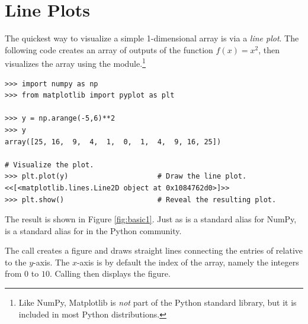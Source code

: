 \label{lab:Matplotlib}

\section*{Line Plots} %

The quickest way to visualize a simple 1-dimensional array is via a \emph{line plot}.
The following code creates an array of outputs of the function $f(x) = x^2$, then visualizes the array using the  module.\footnote{Like NumPy, Matplotlib is \emph{not} part of the Python standard library, but it is included in most Python distributions.}

\begin{lstlisting}
>>> import numpy as np
>>> from matplotlib import pyplot as plt

>>> y = np.arange(-5,6)**2
>>> y
array([25, 16,  9,  4,  1,  0,  1,  4,  9, 16, 25])

# Visualize the plot.
>>> plt.plot(y)                     # Draw the line plot.
<<[<matplotlib.lines.Line2D object at 0x1084762d0>]>>
>>> plt.show()                      # Reveal the resulting plot.
\end{lstlisting}

The result is shown in Figure \ref{fig:basic1}.
Just as  is a standard alias for NumPy,  is a standard alias for  in the Python community.

The call  creates a figure and draws straight lines connecting the entries of  relative to the $y$-axis.
The $x$-axis is by default the index of the array, namely the integers from $0$ to $10$.
Calling  then displays the figure.

